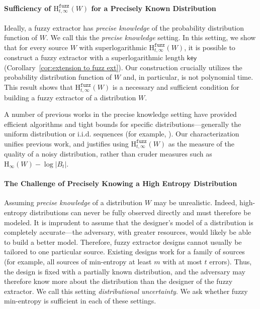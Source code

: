 \documentclass[11pt]{article}
\newcommand{\corref}[1]{\mbox{Corollary~\ref{#1}}}
\newcommand{\class}[1]{{\ensuremath{\mathsf{#1}}}}
\newcommand{\key}{\ensuremath{\class{key}}\xspace}
\newcommand{\Hoo}{\mathrm{H}_\infty}
\newcommand{\Hfuzz}{\mathrm{H}^{\mathtt{fuzz}}_{t,\infty}}
\begin{document}
\paragraph{Sufficiency of $\Hfuzz(W)$ for a Precisely Known Distribution}
Ideally, a fuzzy extractor has \emph{precise knowledge} of the probability distribution function of $W$.  We call this  the \emph{precise knowledge} setting.  In this setting, we show that for every source $W$ with superlogarithmic $\Hfuzz(W)$, it is possible to construct a fuzzy extractor with a superlogarithmic length $\key$ (\corref{cor:extension to fuzz ext}). Our construction crucially utilizes the probability distribution function of $W$ and, in particular, is not polynomial time.  This result shows that $\Hfuzz(W)$ is a necessary and sufficient condition for building a fuzzy extractor of a distribution $W$.  

A number of previous works in the precise knowledge setting have provided efficient algorithms and
tight bounds for specific distributions---generally the uniform distribution or
i.i.d. sequences (for example, \cite{JW99,LT03,DBLP:conf/eccv/TuylsG04,hao2006combining,DBLP:journals/corr/abs-1112-5630,IgnatenkoW2012}). 
Our characterization unifies previous work, and justifies using $\Hfuzz(W)$ as the measure of the quality of a noisy distribution,  rather than cruder measures such as $\Hoo(W)-\log |B_t|$. 

\paragraph{The Challenge of Precisely Knowing a High Entropy Distribution}
Assuming \emph{precise knowledge} of a distribution $W$ may be unrealistic. Indeed, high-entropy distributions can never be fully observed directly and must therefore be modeled. It is imprudent to assume that the designer's model of a distribution is completely accurate---the adversary, with greater resources, would likely be able to build a better model. Therefore, fuzzy extractor designs cannot usually be tailored to one  particular source. Existing designs work for a family of sources (for example, all sources of min-entropy at least $m$ with at most $t$ errors). Thus, the design is fixed with a partially known distribution, and the adversary may therefore know more about the distribution than the designer of the fuzzy extractor.  We call this setting \emph{distributional uncertainty}.
We ask whether fuzzy min-entropy is sufficient in each of these settings.
\end{document}
